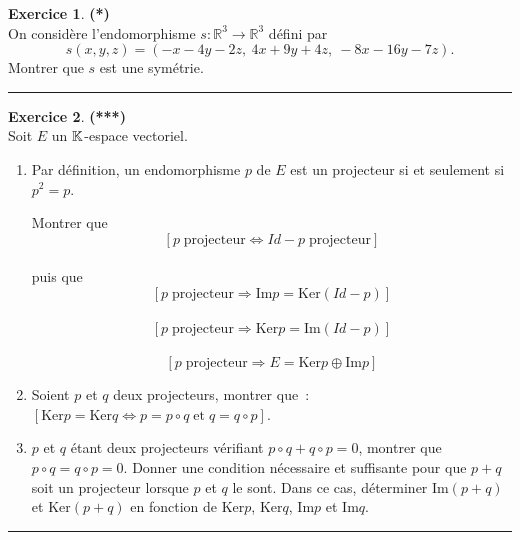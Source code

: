 \documentclass[a4paper,11pt]{article}
\theoremstyle{definition}
\newtheorem{exo}{Exercice} %
\begin{document}
\begin{minipage}{1\linewidth}
\begin{minipage}[t]{0.48\linewidth}
\begin{exo}\textbf{(*)}\quad\\[0.2cm]
On considère l'endomorphisme $s\colon\mathbb R^3\rightarrow\mathbb R^3$ défini par
\[
s(x,y,z)=(-x-4y-2z,\ 4x+9y+4z,\ -8x-16y-7z).
\]
Montrer que $s$ est une symétrie.
	
\centering\rule{1\linewidth}{0.6pt}\end{exo}




\begin{exo}\textbf{(***)}\quad\\[0.2cm]
	Soit $E$ un $\mathbb{K}$-espace vectoriel.
	\begin{enumerate}
		\item  Par définition, un endomorphisme $p$ de $E$ est un projecteur si et seulement si $p^2=p$.
		
		Montrer que\hfill\\[-0.5cm]
		$$\left[p\;\mbox{projecteur}\Leftrightarrow Id-p\;\mbox{projecteur}\right]$$\hfill\\[-0.25cm]
		puis que\hfill\\[-0.5cm]
		$$\left[p\;\mbox{projecteur}\Rightarrow\mbox{Im}p=\mbox{Ker}(Id-p)\right]$$
		\hfill\\[-0.5cm]
		$$\left[p\;\mbox{projecteur}\Rightarrow\mbox{Ker}p=\mbox{Im}(Id-p)\right]$$
		\hfill\\[-0.5cm]
		$$\left[p\;\mbox{projecteur}\Rightarrow E=\mbox{Ker}p\oplus\mbox{Im}p\right]$$
		
		\item  Soient $p$ et $q$ deux projecteurs, montrer que~:~$[\mbox{Ker}p=\mbox{Ker}q\Leftrightarrow p=p\circ
		q\;\mbox{et}\;q=q\circ p]$.
		\item  $p$ et $q$ étant deux projecteurs vérifiant $p\circ q+q\circ p=0$, montrer que $p\circ q=q\circ p=0$. Donner
		une condition nécessaire et suffisante pour que $p+q$ soit un projecteur lorsque $p$ et $q$ le sont. Dans ce
		cas, déterminer $\mbox{Im}(p+q)$ et $\mbox{Ker}(p+q)$ en fonction de $\mbox{Ker}p$, $\mbox{Ker}q$, $\mbox{Im}p$ et
		$\mbox{Im}q$.
	\end{enumerate}
	
	\centering\rule{1\linewidth}{0.6pt}\end{exo}




\end{minipage}\end{minipage}
\end{document}
